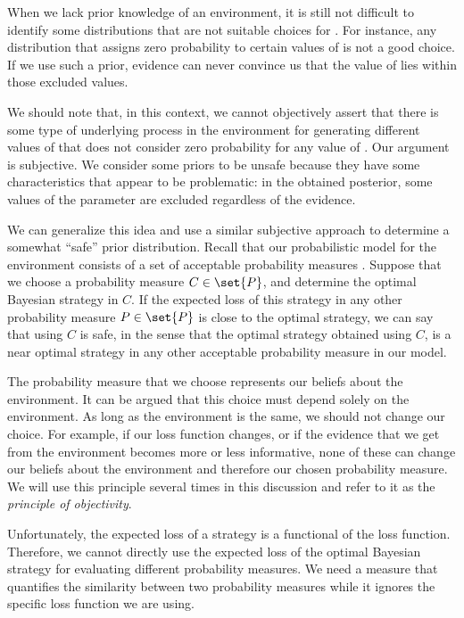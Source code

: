 When we lack prior knowledge of an environment, it is still not difficult to identify some distributions that are
not suitable choices for \prior.
For instance, any distribution that assigns zero probability to certain values of \paramValue is not a good choice.
If we use such a prior, evidence can never convince us that the value of \paramValue lies within those
excluded values.

We should note that, in this context, we cannot objectively assert that there is some type of
underlying process in the environment for generating different values of \paramValue that does not consider zero
probability for any value of \paramValue.
Our argument is subjective.
We consider some priors to be unsafe because they have some characteristics that appear to be problematic:
in the obtained posterior, some values of the parameter are excluded regardless of the evidence.

We can generalize this idea and use a similar subjective approach to determine a somewhat “safe”
prior distribution.
Recall that our probabilistic model for the environment consists of a set of acceptable probability measures .
Suppose that we choose a probability measure $C \in \set{P}$, and determine the optimal Bayesian strategy in $C$.
If the expected loss of this strategy in any other probability measure
$P \in \set{P}$ is close to the optimal strategy, we can say that using $C$ is safe, in the
sense that the optimal strategy obtained using $C$, is a near optimal strategy in any other acceptable probability
measure in our model.


The probability measure that we choose represents our beliefs about the environment.
It can be argued that this choice must depend solely on the environment.
As long as the environment is the same, we should not change our choice.
For example, if our loss function changes, or if the evidence that we get from the environment becomes more or
less informative, none of these can change our beliefs about the environment and therefore our chosen
probability measure.
We will use this principle several times in this discussion and refer to it as the \emph{principle of objectivity}.

Unfortunately, the expected loss of a strategy is a functional of the loss function.
Therefore, we cannot directly use the expected loss of the optimal Bayesian strategy for evaluating
different probability measures.
We need a measure that quantifies the similarity between two probability measures while it ignores the
specific loss function we are using.

